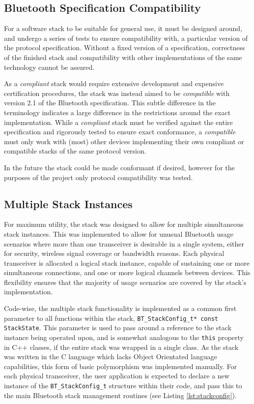 \FloatBarrier
\subsection{Bluetooth Specification Compatibility}

For a software stack to be suitable for general use, it must be designed around, and undergo a series of tests to ensure compatibility with, a particular version of the protocol specification. Without a fixed version of a specification, correctness of the finished stack and compatibility with other implementations of the same technology cannot be assured.

As a \textit{compliant} stack would require extensive development and expensive certification procedures, the stack was instead aimed to be \textit{compatible} with version 2.1 of the Bluetooth specification. This subtle difference in the terminology indicates a large difference in the restrictions around the exact implementation. While a \textit{compliant} stack must be verified against the entire specification and rigorously tested to ensure exact conformance, a \textit{compatible} must only work with (most) other devices implementing their own compliant or compatible stacks of the same protocol version.

In the future the stack could be made conformant if desired, however for the purposes of the project only protocol compatibility was tested.

\FloatBarrier
\subsection{Multiple Stack Instances}

For maximum utility, the stack was designed to allow for multiple simultaneous stack instances. This was implemented to allow for unusual Bluetooth usage scenarios where more than one transceiver is desirable in a single system, either for security, wireless signal coverage or bandwidth reasons. Each physical transceiver is allocated a logical stack instance, capable of sustaining one or more simultaneous connections, and one or more logical channels between devices. This flexibility ensures that the majority of usage scenarios are covered by the stack's implementation.

Code-wise, the multiple stack functionality is implemented as a common first parameter to all functions within the stack, \lstinline{BT_StackConfig_t* const StackState}. This parameter is used to pass around a reference to the stack instance being operated upon, and is somewhat analogous to the \lstinline{this} property in C++ classes, if the entire stack was wrapped in a single class. As the stack was written in the C language which lacks Object Orientated language capabilities, this form of basic polymorphism was implemented manually. For each physical transceiver, the user application is expected to declare a new instance of the \lstinline{BT_StackConfig_t} structure within their code, and pass this to the main Bluetooth stack management routines (see Listing \ref{lst:stackconfig}).

